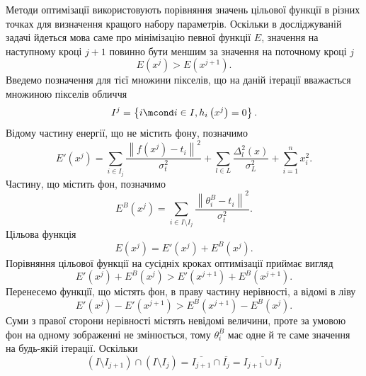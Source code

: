 Методи оптимізації використовують порівняння
значень цільової функції в різних точках
для визначення кращого набору параметрів.
Оскільки в досліджуваній задачі
йдеться мова саме про мінімізацію певної функції $E$,
значення на наступному кроці $j+1$
повинно бути меншим за значення на поточному кроці $j$
\begin{equation*}
  E\left( x^j \right) > E\left( x^{j+1} \right).
\end{equation*}
Введемо позначення для тієї множини пікселів,
що на даній ітерації вважається множиною пікселів обличчя
\begin{equation*}
  I^j = \left\{ i \mcond i \in I, h_i\left( x^j \right) = 0 \right\}.
\end{equation*}
Відому частину енергії, що не містить фону, позначимо
\begin{equation*}
  E'\left( x^j \right)
  = \sum_{i \in I_j} \frac{\left\| f\left( x^j \right) - t_i \right\|^2}{\sigma^2_t}
    + \sum_{l \in L} \frac{\Delta_l^2\left( x \right)}{\sigma_L^2}
    + \sum_{i = 1}^n x_i^2.
\end{equation*}
Частину, що містить фон, позначимо
\begin{equation*}
  E^B\left( x^j \right)
  = \sum_{i \in I \setminus I_j} \frac{\left\| \theta_i^B - t_i \right\|^2}{\sigma^2_t}.
\end{equation*}
Цільова функція
\begin{equation*}
  E\left( x^j \right) = E'\left( x^j \right) + E^B\left( x^j \right).
\end{equation*}
Порівняння цільової функції на сусідніх кроках оптимізації приймає вигляд
\begin{equation*}
  E'\left( x^j \right) + E^B\left( x^j \right)
  > E'\left( x^{j+1} \right) + E^B\left( x^{j+1} \right).
\end{equation*}
Перенесемо функції, що містять фон, в праву частину нерівності,
а відомі в ліву
\begin{equation}\label{eq:energy:comparison}
  E'\left( x^j \right) - E'\left( x^{j+1} \right)
  > E^B\left( x^{j+1} \right) - E^B\left( x^j \right).
\end{equation}
Суми з правої сторони нерівності містять невідомі величини,
проте за умовою фон на одному зображенні не змінюється,
тому $\theta^B_i$ має одне й те саме значення на будь-якій ітерації.
Оскільки
\begin{equation*}
  \left( I \setminus I_{j+1} \right) \cap \left( I \setminus I_j \right)
  = \overline{I_{j+1}} \cap \overline{I_j}
  = \overline{I_{j+1} \cup I_j}
\end{equation*}
